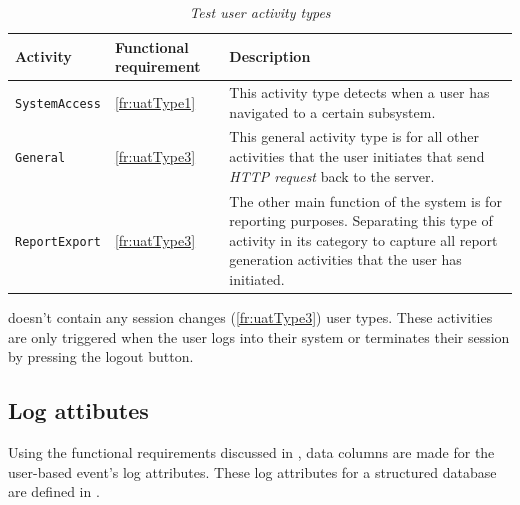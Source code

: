 \begin{table}[!htb]
	\centering
	\caption[Test user activity types]{\textit{Test user activity types}}
	\label{tbl:ch3_testActivityTypes}
	\begin{tabularx}{\textwidth}{llX}
		\toprule
		\textbf{Activity} & \textbf{Functional requirement} & \textbf{Description} \\
		\midrule
		\rowcolor{lightgray}
		\texttt{SystemAccess} & \ref{fr:uatType1} & \RaggedRight This activity type detects when a user has navigated to a certain subsystem. \\ 
		\texttt{General} & \ref{fr:uatType3} & \RaggedRight This general activity type is for all other activities that the user initiates that send \textit{HTTP request} back to the server. \\
		\rowcolor{lightgray}
		\texttt{ReportExport} & \ref{fr:uatType3} & \RaggedRight The other main function of the system is for reporting purposes. Separating this type of activity in its category to capture all report generation activities that the user has initiated. \\ 
		\bottomrule
	\end{tabularx}
\end{table}

 doesn't contain any session changes (\ref{fr:uatType3}) user types. These activities are only triggered when the user logs into their system or terminates their session by pressing the logout button.

\subsection{Log attibutes}\label{sec:ch3_implementationLogAtrributes}
Using the functional requirements discussed in , data columns are made for the user-based event's log attributes. These log attributes for a structured database are defined in . 


